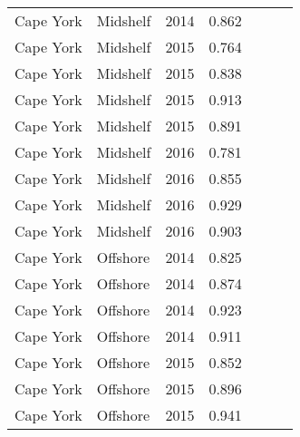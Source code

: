 {\begin{longtable}{llccccc}
  Cape York & Midshelf & 2014 & 0.862 & \cellcolor[HTML]{00734D}{A} & \cellcolor[HTML]{00734D}{A} & \cellcolor[HTML]{00734D}{A} \\ 
  Cape York & Midshelf & 2015 & 0.764 & \cellcolor[HTML]{B0D235}{B} & \cellcolor[HTML]{B0D235}{B} & \cellcolor[HTML]{B0D235}{B} \\ 
  Cape York & Midshelf & 2015 & 0.838 & \cellcolor[HTML]{00734D}{A} & \cellcolor[HTML]{00734D}{A} & \cellcolor[HTML]{B0D235}{B} \\ 
  Cape York & Midshelf & 2015 & 0.913 & \cellcolor[HTML]{00734D}{A} & \cellcolor[HTML]{00734D}{A} & \cellcolor[HTML]{00734D}{A} \\ 
  Cape York & Midshelf & 2015 & 0.891 & \cellcolor[HTML]{00734D}{A} & \cellcolor[HTML]{00734D}{A} & \cellcolor[HTML]{00734D}{A} \\ 
  Cape York & Midshelf & 2016 & 0.781 & \cellcolor[HTML]{B0D235}{B} & \cellcolor[HTML]{B0D235}{B} & \cellcolor[HTML]{B0D235}{B} \\ 
  Cape York & Midshelf & 2016 & 0.855 & \cellcolor[HTML]{00734D}{A} & \cellcolor[HTML]{00734D}{A} & \cellcolor[HTML]{00734D}{A} \\ 
  Cape York & Midshelf & 2016 & 0.929 & \cellcolor[HTML]{00734D}{A} & \cellcolor[HTML]{00734D}{A} & \cellcolor[HTML]{00734D}{A} \\ 
  Cape York & Midshelf & 2016 & 0.903 & \cellcolor[HTML]{00734D}{A} & \cellcolor[HTML]{00734D}{A} & \cellcolor[HTML]{00734D}{A} \\ 
  Cape York & Offshore & 2014 & 0.825 & \cellcolor[HTML]{B0D235}{B} & \cellcolor[HTML]{00734D}{A} & \cellcolor[HTML]{B0D235}{B} \\ 
  Cape York & Offshore & 2014 & 0.874 & \cellcolor[HTML]{00734D}{A} & \cellcolor[HTML]{00734D}{A} & \cellcolor[HTML]{00734D}{A} \\ 
  Cape York & Offshore & 2014 & 0.923 & \cellcolor[HTML]{00734D}{A} & \cellcolor[HTML]{00734D}{A} & \cellcolor[HTML]{00734D}{A} \\ 
  Cape York & Offshore & 2014 & 0.911 & \cellcolor[HTML]{00734D}{A} & \cellcolor[HTML]{00734D}{A} & \cellcolor[HTML]{00734D}{A} \\ 
  Cape York & Offshore & 2015 & 0.852 & \cellcolor[HTML]{00734D}{A} & \cellcolor[HTML]{00734D}{A} & \cellcolor[HTML]{00734D}{A} \\ 
  Cape York & Offshore & 2015 & 0.896 & \cellcolor[HTML]{00734D}{A} & \cellcolor[HTML]{00734D}{A} & \cellcolor[HTML]{00734D}{A} \\ 
  Cape York & Offshore & 2015 & 0.941 & \cellcolor[HTML]{00734D}{A} & \cellcolor[HTML]{00734D}{A} & \cellcolor[HTML]{00734D}{A} \\ 

\end{longtable}}
